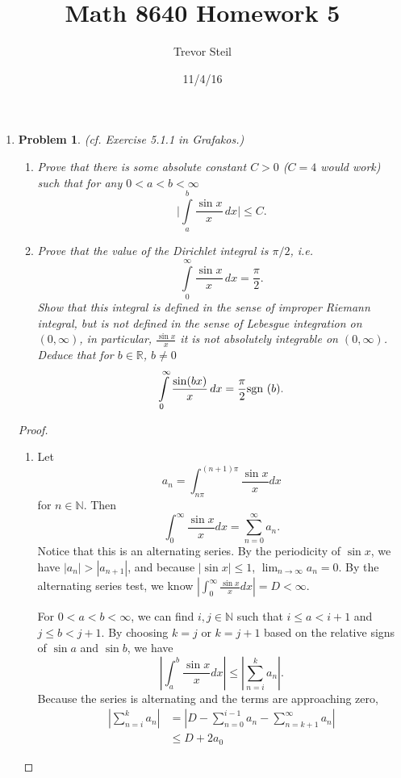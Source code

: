 \documentclass[a4paper]{article}
\title{Math 8640 Homework 5 }
\date{11/4/16}
\author{Trevor Steil}
\newtheorem*{problem}{Problem}
\newcommand{\N}{\mathbb{N}}
\begin{document}
\maketitle

\begin{enumerate}
\item
  \begin{problem}
    (cf. Exercise 5.1.1 in Grafakos.)
    \begin{enumerate}
    \item Prove that there is some absolute constant $C>0$ ($C=4$ would work) such that  for any $0<a<b<\infty$
    $$ \bigg| \int\limits_a^b \frac{\sin x}{x} \, dx \bigg| \le C.$$
    \item Prove that the value of the {\it{Dirichlet integral}} is $\pi/2$, i.e. $$  \int\limits_0^\infty \frac{\sin x}{x} \, dx = \frac{\pi}2.$$
    Show that this integral is defined in the sense of improper Riemann integral, but is not defined in the sense of Lebesgue integration on $(0,\infty)$, in particular, $\frac{\sin{x}}{x}$ it is not absolutely integrable on $(0,\infty)$.
    Deduce that  for $b\in \mathbb R$, $b\neq 0$ $$  \int\limits_0^\infty \frac{\sin (bx)}{x} \, dx = \frac{\pi}2 \textup{sgn } (b).$$
    \end{enumerate}
  \end{problem}

  \begin{proof}

    \begin{enumerate}
      \item
        Let
        \[ a_n = \int_{n \pi}^{(n+1) \pi} \frac{\sin x}{x} dx \]
        for $n \in \N$. Then
        \[ \int_{0}^{\infty} \frac{\sin x}{x} dx = \sum_{n=0}^\infty a_n .\]
        Notice that this is an alternating series. By the periodicity of $\sin x$, we have $|a_n| > |a_{n+1}|$, and because $|\sin x| \leq 1$, $\lim_{n
        \to \infty} a_n = 0$. By the alternating series test, we know $\left| \int_{0}^{\infty} \frac{\sin x}{x} dx \right| = D < \infty$.

        For $0<a<b<\infty$, we can find $i,j \in \N$ such that $i \leq a < i+1$ and $j \leq b < j+1$. By choosing $k = j$ or $k=j+1$ based on the
        relative signs of $\sin a$ and $\sin b$, we have
        \[ \left| \int_{a}^{b} \frac{\sin x}{x} dx \right| \leq \left| \sum_{n=i}^k a_n \right| .\]
        Because the series is alternating and the terms are approaching zero,
        \begin{align*}
          \left| \sum_{n=i}^k a_n \right| &= \left| D - \sum_{n=0}^{i-1} a_n - \sum_{n=k+1}^\infty a_n \right| \\
          &\leq D + 2 a_0
        \end{align*}


\end{enumerate}
\end{proof}
\end{enumerate}
\end{document}
